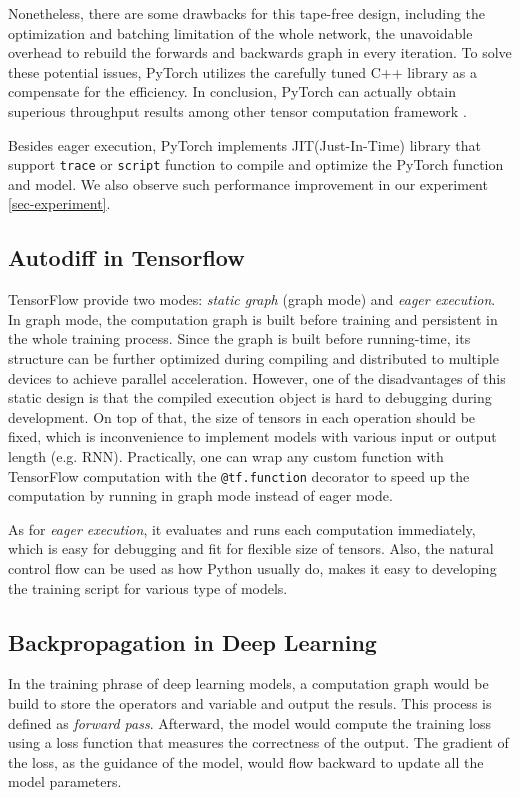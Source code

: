 \documentclass[12pt,twocolumn,letterpaper]{extarticle}
\begin{document}
Nonetheless, there are some drawbacks for this tape-free design, including the optimization and batching limitation of the whole network, the unavoidable overhead to rebuild the forwards and backwards graph in every iteration. To solve these potential issues, PyTorch utilizes the carefully tuned C++ library as a compensate for the efficiency. In conclusion, PyTorch can actually obtain superious throughput results among other tensor computation framework \cite{NEURIPS2019_bdbca288}.

Besides eager execution, PyTorch implements JIT\;(Just-In-Time) library that support \texttt{trace} or \texttt{script} function to compile and optimize the PyTorch function and model. We also observe such performance improvement in our experiment \ref{sec-experiment}.

\subsection{Autodiff in Tensorflow} \label{sec:tensorflow}

TensorFlow provide two modes: \emph{static graph}\; (graph mode) and \emph{eager execution}. In graph mode, the computation graph is built before training and persistent in the whole training process. Since the graph is built before running-time, its structure can be further optimized during compiling and distributed to multiple devices to achieve parallel acceleration. However, one of the disadvantages of this static design is that the compiled execution object is hard to debugging during development. On top of that, the size of tensors in each operation should be fixed, which is inconvenience to implement models with various input or output length (e.g. RNN). Practically, one can wrap any custom function with TensorFlow computation with the \texttt{@tf.function} decorator to speed up the computation by running in graph mode instead of eager mode.

As for \emph{eager execution}, it evaluates and runs each computation immediately, which is easy for debugging and fit for flexible size of tensors. Also, the natural control flow can be used as how Python usually do, makes it easy to developing the training script for various type of models. 

\subsection{Backpropagation in Deep Learning}
In the training phrase of deep learning models, a computation graph would be build to store the operators and variable and output the resuls. This process is defined as \emph{forward pass}. Afterward, the model would compute the training loss using a loss function that measures the correctness of the output. The gradient of the loss, as the guidance of the model, would flow backward to update all the model parameters.
\end{document}

